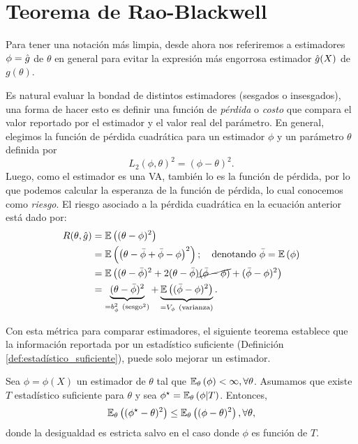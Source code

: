 \section{Teorema de Rao-Blackwell}
Para tener una notación más limpia, desde ahora nos referiremos a estimadores $\phi={ \hat{g}}$ de $\theta$ en general para evitar la expresión más engorrosa estimador ${ \hat{g}}(X)$ de $g(\theta)$.



Es natural evaluar la bondad de distintos estimadores (sesgados o insesgados), una forma de hacer esto es definir una función de \textit{pérdida} o \textit{costo} que compara el valor reportado por el estimador y el valor real del parámetro. En general, elegimos la función de pérdida cuadrática para un estimador $\phi$ y un parámetro $\theta$ definida por 
\begin{equation}
	L_2(\phi,\theta)^2 = (\phi - \theta)^2.
\end{equation}
Luego, como el estimador es una VA, también lo es la función de pérdida, por lo que podemos calcular la esperanza de la función de pérdida, lo cual conocemos como \textit{riesgo}. El riesgo asociado a la pérdida cuadrática en la ecuación anterior está dado por: 
\begin{alignat}{3}
 	R(\theta, \hat{g})  &= \E{(\theta - \phi)^2}\nonumber\\
 						& = \E{\left(\theta - \bar{\phi}+ \bar{\phi} -\phi\right)^2}; \quad \text{denotando }\bar{\phi} = \E{ \phi}\nonumber\\
 						& = \E{(\theta - \bar{\phi})^2+2(\theta - \bar{\phi})\cancel{(\bar{\phi} -\phi)} +  (\bar{\phi} -\phi)^2}\nonumber\\
 						& = \underbrace{(\theta - \bar{\phi})^2}_{=b_{\phi}^2\ (\text{sesgo}^2)} +  \underbrace{\E{(\bar{\phi} -\phi)^2}}_{=V_{\phi}\ \text{(varianza)}}.\label{eq:riesgo_cuad}
 \end{alignat} 


Con esta métrica para comparar estimadores, el siguiente teorema establece que la información reportada por un estadístico suficiente (Definición \ref{def:estadístico_suficiente}), puede solo mejorar un estimador. 

\begin{theorem}
	\label{teo:rao-blackwell}
	Sea $\phi = \phi(X)$ un estimador de $\theta$ tal que $\mathbb{E}_\theta \left(\phi\right)<\infty, \forall \theta$. Asumamos que existe $T$ estadístico suficiente para $\theta$ y sea $\phi^\star = \mathbb{E}_\theta \left(\phi|T\right)$. Entonces, 
	\begin{equation}
		\mathbb{E}_\theta \left((\phi^\star-\theta)^2\right) \leq \mathbb{E}_\theta \left((\phi-\theta)^2\right), \forall\theta,
	\end{equation}
	donde la desigualdad es estricta salvo en el caso donde $\phi$ es función de $T$.
\end{theorem}

